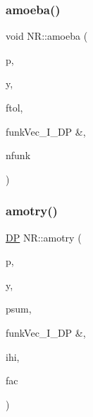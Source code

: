 \mbox{\label{namespaceNR_a55aa747fecbb0e45dc63e070662c6e2c}} 
\subsubsection{\texorpdfstring{amoeba()}{amoeba()}}
{\footnotesize\ttfamily void N\+R\+::amoeba (\begin{DoxyParamCaption}\item[{\mbox{\hyperlink{namespaceNR_ad1513aa4697878ed3bff0b8b3c9dd910}{Mat\+\_\+\+I\+O\+\_\+\+DP}} \&}]{p,  }\item[{\mbox{\hyperlink{namespaceNR_ab293e06a6bf799d8a7ed932b6852bcb8}{Vec\+\_\+\+I\+O\+\_\+\+DP}} \&}]{y,  }\item[{const \mbox{\hyperlink{namespaceNR_af6ff762dd605ff477b8e52387253a02a}{DP}}}]{ftol,  }\item[{\mbox{\hyperlink{namespaceNR_af6ff762dd605ff477b8e52387253a02a}{DP}} }]{funkVec\+\_\+\+I\+\_\+\+D\+P \&,  }\item[{int \&}]{nfunk }\end{DoxyParamCaption})}

\mbox{\label{namespaceNR_a752225a62f24c2b80c703fd887f5c56e}} 
\subsubsection{\texorpdfstring{amotry()}{amotry()}}
{\footnotesize\ttfamily \mbox{\hyperlink{namespaceNR_af6ff762dd605ff477b8e52387253a02a}{DP}} N\+R\+::amotry (\begin{DoxyParamCaption}\item[{\mbox{\hyperlink{namespaceNR_ad1513aa4697878ed3bff0b8b3c9dd910}{Mat\+\_\+\+I\+O\+\_\+\+DP}} \&}]{p,  }\item[{\mbox{\hyperlink{namespaceNR_a970094d23441f8ef6a45282a7eb2103d}{Vec\+\_\+\+O\+\_\+\+DP}} \&}]{y,  }\item[{\mbox{\hyperlink{namespaceNR_ab293e06a6bf799d8a7ed932b6852bcb8}{Vec\+\_\+\+I\+O\+\_\+\+DP}} \&}]{psum,  }\item[{\mbox{\hyperlink{namespaceNR_af6ff762dd605ff477b8e52387253a02a}{DP}} }]{funkVec\+\_\+\+I\+\_\+\+D\+P \&,  }\item[{const int}]{ihi,  }\item[{const \mbox{\hyperlink{namespaceNR_af6ff762dd605ff477b8e52387253a02a}{DP}}}]{fac }\end{DoxyParamCaption})}

